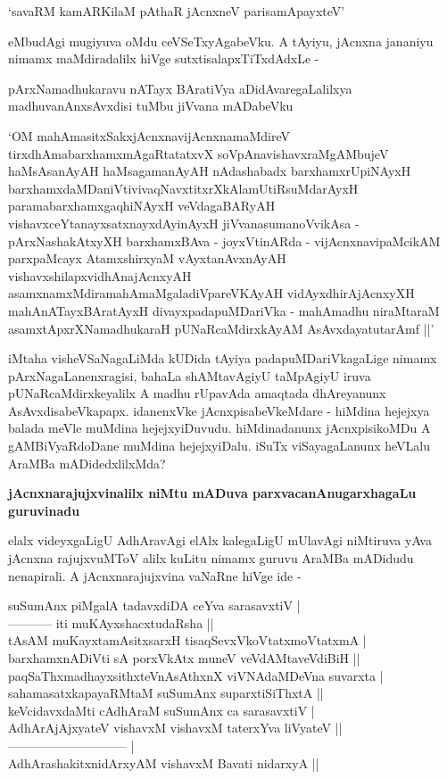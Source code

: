 \begin{shloka}
`savaRM kamARKilaM pAthaR jAcnxneV parisamApayxteV'
\end{shloka}

eMbudAgi mugiyuva oMdu ceVSeTxyAgabeVku. A tAyiyu, jAcnxna jananiyu nimamx maMdiradalilx hiVge sutxtisalapxTiTxdAdxLe -

pArxNamadhukaravu nATayx BAratiVya aDidAvaregaLalilxya madhuvanAnxsAvxdisi tuMbu jiVvana mADabeVku

`OM mahAmasitxSakxjAcnxnavijAcnxnamaMdireV\label{81} tirxdhAmabarxhamxmAgaRtatatxvX soVpAnavishavxraMgAMbujeV haMsAsanAyAH haMsagamanAyAH nAdashabadx barxhamxrUpiNAyxH barxhamxdaMDaniVtivivaqNavxtitxrXkAlamUtiRsuMdarAyxH paramabarxhamxgaqhiNAyxH veVdagaBARyAH vishavxceYtanayxsatxnayxdAyinAyxH jiVvanasumanoVvikAsa - pArxNashakAtxyXH barxhamxBAva - joyxVtinARda - vijAcnxnavipaMcikAM parxpaMcayx AtamxshirxyaM vAyxtanAvxnAyAH vishavxshilapxvidhAnajAcnxyAH asamxnamxMdiramahAmaMgaladiVpareVKAyAH vidAyxdhirAjAcnxyXH mahAnATayxBAratAyxH divayxpadapuMDariVka - mahAmadhu niraMtaraM asamxtApxrXNamadhukaraH pUNaRcaMdirxkAyAM AsAvxdayatutarAmf ||'

iMtaha visheVSaNagaLiMda kUDida tAyiya padapuMDariVkagaLige nimamx pArxNagaLanenxragisi, bahaLa shAMtavAgiyU taMpAgiyU iruva pUNaRcaMdirxkeyalilx A madhu rUpavAda amaqtada dhAreyanunx AsAvxdisabeVkapapx. idanenxVke jAcnxpisabeVkeMdare - hiMdina hejejxya balada meVle muMdina hejejxyiDuvudu. hiMdinadanunx jAcnxpisikoMDu A gAMBiVyaRdoDane muMdina hejejxyiDalu. iSuTx viSayagaLanunx heVLalu AraMBa mADidedxlilxMda?

\noindent
\textbf{jAcnxnarajujxvinalilx niMtu mADuva parxvacanAnugarxhagaLu guruvinadu}\label{page82}

elalx videyxgaLigU AdhAravAgi elAlx kalegaLigU mUlavAgi niMtiruva yAva jAcnxna rajujxvuMToV alilx kuLitu nimamx guruvu AraMBa mADidudu nenapirali. A jAcnxnarajujxvina vaNaRne hiVge ide - 

\begin{shloka}
suSumAnx piMgalA tadavxdiDA ceYva sarasavxtiV |\\\label{82}
----------- iti muKAyxshacxtudaRsha ||\\

tAsAM muKayxtamAsitxsarxH tisaqSevxVkoVtatxmoVtatxmA |\\
barxhamxnADiVti sA porxVkAtx muneV veVdAMtaveVdiBiH ||\\
paqSaThxmadhayxsithxteVnAsAthxnX viVNAdaMDeVna suvarxta |\\
sahamasatxkapayaRMtaM suSumAnx suparxtiSiThxtA ||\\

keVcidavxdaMti cAdhAraM suSumAnx ca sarasavxtiV |\\\label{82}
AdhArAjAjxyateV vishavxM vishavxM taterxYva liVyateV ||\\
----------------------------- |\\
AdhArashakitxnidArxyAM vishavxM Bavati nidarxyA ||
\end{shloka}

